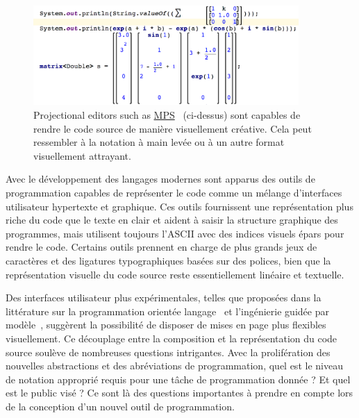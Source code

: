 {\begin{figure}
\centering
\includegraphics[width=0.90\textwidth]{../figures/mps_screenshot.png}
\caption{Projectional editors such as \href{https://www.jetbrains.com/mps/}{MPS}~\citep{voelter2010language, pech2013jetbrains} (ci-dessus) sont capables de rendre le code source de manière visuellement créative. Cela peut ressembler à la notation à main levée ou à un autre format visuellement attrayant.}
\label{fig:mps_screenshot}
\end{figure}

Avec le développement des langages modernes sont apparus des outils de programmation capables de représenter le code comme un mélange d'interfaces utilisateur hypertexte et graphique. Ces outils fournissent une représentation plus riche du code que le texte en clair et aident à saisir la structure graphique des programmes, mais utilisent toujours l'ASCII avec des indices visuels épars pour rendre le code. Certains outils prennent en charge de plus grands jeux de caractères et des ligatures typographiques basées sur des polices, bien que la représentation visuelle du code source reste essentiellement linéaire et textuelle.

Des interfaces utilisateur plus expérimentales, telles que proposées dans la littérature sur la programmation orientée langage~\citep{dmitriev2004language} et l'ingénierie guidée par modèle~\citep{famelis2015mummint}, suggèrent la possibilité de disposer de mises en page plus flexibles visuellement. Ce découplage entre la composition et la représentation du code source soulève de nombreuses questions intrigantes. Avec la prolifération des nouvelles abstractions et des abréviations de programmation, quel est le niveau de notation approprié requis pour une tâche de programmation donnée ? Et quel est le public visé ? Ce sont là des questions importantes à prendre en compte lors de la conception d'un nouvel outil de programmation.

}
